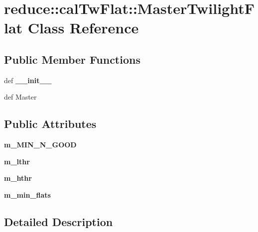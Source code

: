\section{reduce::cal\-Tw\-Flat::Master\-Twilight\-Flat Class Reference}
\label{classreduce_1_1calTwFlat_1_1MasterTwilightFlat}
\subsection*{Public Member Functions}
\begin{CompactItemize}
\item 
def \textbf{\_\-\_\-init\_\-\_\-}\label{classreduce_1_1calTwFlat_1_1MasterTwilightFlat_6670264eea31c5a4a4312c339047304d}

\item 
def {\bfcreate\-Master}
\end{CompactItemize}
\subsection*{Public Attributes}
\begin{CompactItemize}
\item 
\textbf{m\_\-MIN\_\-N\_\-GOOD}\label{classreduce_1_1calTwFlat_1_1MasterTwilightFlat_f896a5ed8401e47f70837c8a88bb3512}

\item 
\textbf{m\_\-lthr}\label{classreduce_1_1calTwFlat_1_1MasterTwilightFlat_71bef7f41622c6803b20b57c5dcc5009}

\item 
\textbf{m\_\-hthr}\label{classreduce_1_1calTwFlat_1_1MasterTwilightFlat_47a4e6579060bfbe8b39f6687dcfd0f0}

\item 
\textbf{m\_\-min\_\-flats}\label{classreduce_1_1calTwFlat_1_1MasterTwilightFlat_a207ba003e7e51d493d431b4bcb48339}

\end{CompactItemize}


\subsection{Detailed Description}


